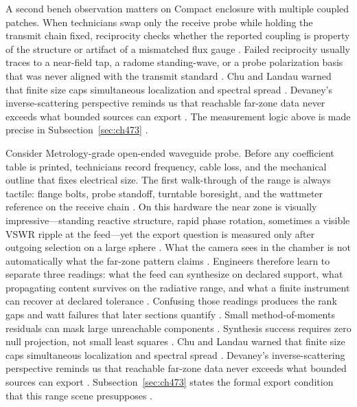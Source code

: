 \begin{physicalvignette}
A second bench observation matters on Compact enclosure with multiple coupled patches. When technicians swap only the receive probe while holding the transmit chain fixed, reciprocity checks whether the reported coupling is property of the structure or artifact of a mismatched flux gauge \cite{stratton1941}. Failed reciprocity usually traces to a near-field tap, a radome standing-wave, or a probe polarization basis that was never aligned with the transmit standard \cite{hansen1988}.
Chu and Landau warned that finite size caps simultaneous localization and spectral spread \cite{chu1948}. Devaney's inverse-scattering perspective reminds us that reachable far-zone data never exceeds what bounded sources can export \cite{devaney2004}.
The measurement logic above is made precise in Subsection~\ref{sec:ch473} \cite{stratton1941}.
\end{physicalvignette}
\begin{physicalvignette}
Consider Metrology-grade open-ended waveguide probe. Before any coefficient table is printed, technicians record frequency, cable loss, and the mechanical outline that fixes electrical size. The first walk-through of the range is always tactile: flange bolts, probe standoff, turntable boresight, and the wattmeter reference on the receive chain \cite{hansen1988}.
On this hardware the near zone is visually impressive---standing reactive structure, rapid phase rotation, sometimes a visible VSWR ripple at the feed---yet the export question is measured only after outgoing selection on a large sphere \cite{harrington2001}. What the camera sees in the chamber is not automatically what the far-zone pattern claims \cite{stratton1941}.
Engineers therefore learn to separate three readings: what the feed can synthesize on declared support, what propagating content survives on the radiative range, and what a finite instrument can recover at declared tolerance \cite{devaney2004}. Confusing those readings produces the rank gaps and watt failures that later sections quantify \cite{pal2026}.
Small method-of-moments residuals can mask large unreachable components . Synthesis success requires zero null projection, not small least squares .
Chu and Landau warned that finite size caps simultaneous localization and spectral spread \cite{chu1948}. Devaney's inverse-scattering perspective reminds us that reachable far-zone data never exceeds what bounded sources can export \cite{devaney2004}.
Subsection~\ref{sec:ch473} states the formal export condition that this range scene presupposes \cite{stratton1941}.
\end{physicalvignette}
